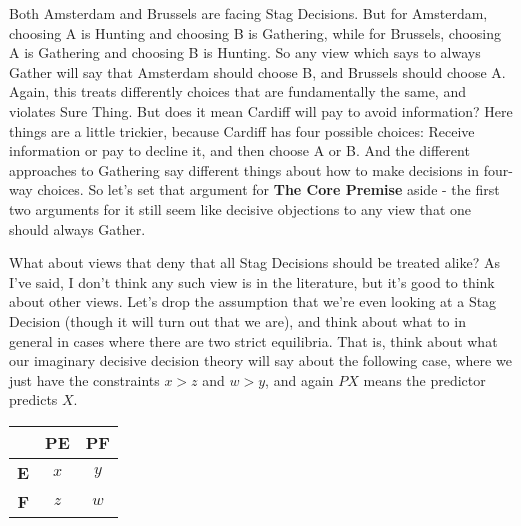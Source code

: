 \documentclass[
  12pt,
]{article}
\begin{document}
Both Amsterdam and Brussels are facing Stag Decisions. But for
Amsterdam, choosing A is Hunting and choosing B is Gathering, while for
Brussels, choosing A is Gathering and choosing B is Hunting. So any view
which says to always Gather will say that Amsterdam should choose B, and
Brussels should choose A. Again, this treats differently choices that
are fundamentally the same, and violates Sure Thing. But does it mean
Cardiff will pay to avoid information? Here things are a little
trickier, because Cardiff has four possible choices: Receive information
or pay to decline it, and then choose A or B. And the different
approaches to Gathering say different things about how to make decisions
in four-way choices. So let's set that argument for \textbf{The Core
Premise} aside - the first two arguments for it still seem like decisive
objections to any view that one should always Gather.

What about views that deny that all Stag Decisions should be treated
alike? As I've said, I don't think any such view is in the literature,
but it's good to think about other views. Let's drop the assumption that
we're even looking at a Stag Decision (though it will turn out that we
are), and think about what to in general in cases where there are two
strict equilibria. That is, think about what our imaginary decisive
decision theory will say about the following case, where we just have
the constraints \(x > z\) and \(w > y\), and again \(PX\) means the
predictor predicts \(X\).

\begin{table}[H]
\centering
\begin{tabular}[t]{>{}r|cc}

\textbf{ } & \textbf{PE} & \textbf{PF}\\
\midrule
\textbf{E} & $x$ & $y$\\
\textbf{F} & $z$ & $w$\\

\end{tabular}
\end{table}
\end{document}
